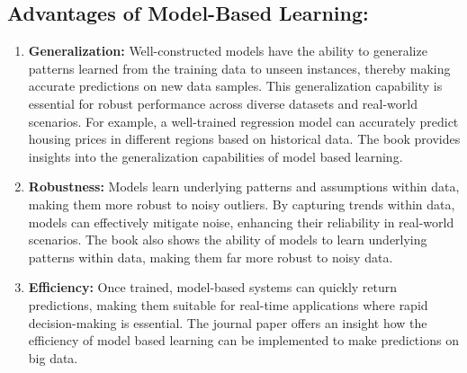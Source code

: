 \documentclass[a4paper, 12pt]{report}
\begin{document}
\subsection{Advantages of Model-Based Learning:}
\begin{enumerate}
	\item \textbf{Generalization:} Well-constructed models have the ability to generalize patterns learned from the training data to unseen instances, thereby making accurate predictions on new data samples.
	      This generalization capability is essential for robust performance across diverse datasets and real-world scenarios.
	      For example, a well-trained regression model can accurately predict housing prices in different regions based on historical data.
          The book \cite{bishop2006pattern} provides insights into the generalization capabilities of model based learning.
	\item \textbf{Robustness:} Models learn underlying patterns and assumptions within data, making them more robust to noisy outliers.
	      By capturing trends within data, models can effectively mitigate noise, enhancing their reliability in real-world scenarios.
          The book \cite{bishop2006pattern} also shows the ability of models to learn underlying patterns within data, making them far more robust to noisy data.
	\item \textbf{Efficiency:} Once trained, model-based systems can quickly return predictions, 
           making them suitable for real-time applications where rapid decision-making is essential. 
           The journal paper \cite{gupta2016scalable} offers an insight how the efficiency of model based learning can be implemented to make predictions on big data.

\end{enumerate}
\end{document}
